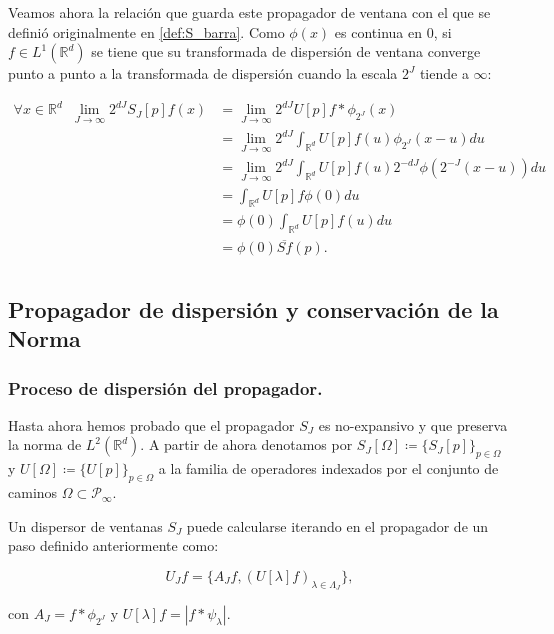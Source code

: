 \noindent Veamos ahora la relación que guarda este propagador de ventana con el que se definió originalmente en \autoref{def:S_barra}. Como $\phi(x)$ es continua en $0$, si $f\in L^1 (\mathbb{R}^d)$ se tiene que su transformada de dispersión de ventana converge punto a punto a la transformada de dispersión cuando la escala $2^J$ tiende a $\infty$: 

\begin{align*}
    \forall x \in \mathbb{R}^d \;\; \lim_{J \rightarrow \infty} 2^{dJ} S_J[p]f(x) 
    &=\lim_{J \rightarrow \infty} 2^{dJ} U[p]f \ast \phi_{2^J}(x) \\
    &=\lim_{J \rightarrow \infty} 2^{dJ} \int_{\mathbb{R}^d} U[p]f(u)\phi_{2^J}(x-u) du \\
    &=\lim_{J \rightarrow \infty} 2^{dJ} \int_{\mathbb{R}^d} U[p]f(u) 2^{-dJ} \phi(2^{-J}(x-u)) du   \\
    &= \int_{\mathbb{R}^d} U[p]f \phi(0) du  \\
    &=\phi(0)\int_{\mathbb{R}^d}U[p]f(u) du \\
    &= \phi(0)\overline{Sf}(p).\\ 
\end{align*}

\subsection{Propagador de dispersión y conservación de la Norma} \label{ch:seccion13}


\subsubsection{Proceso de dispersión del propagador.}

\noindent Hasta ahora hemos probado que el propagador $S_J$ es no-expansivo y que preserva la norma de $L^2(\mathbb{R}^d)$. A partir de ahora denotamos por $S_J[\Omega] \coloneqq \lbrace S_J[p] \rbrace_{p\in\Omega}$ y $U[\Omega]\coloneqq \lbrace U[p] \rbrace_{p\in\Omega}$ a la familia de operadores indexados por el conjunto de caminos $\Omega \subset \mathcal{P}_\infty$.

\medskip

\noindent Un dispersor de ventanas $S_J$ puede calcularse iterando en el propagador de un paso definido anteriormente como: 

$$U_Jf=\lbrace A_Jf, (U[\lambda]f)_{\lambda\in\Lambda_J} \rbrace,$$

\noindent con $A_J=f\ast \phi_{2^J}$ y $U[\lambda]f=\left| f\ast \psi_\lambda \right|$. 

